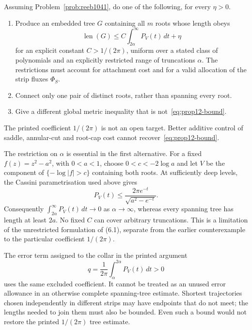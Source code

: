 \begin{problem}\label{prob:metric1041}
Assuming Problem~\ref{prob:reeb1041}, do one of the following, for every
$\eta>0$.
\begin{enumerate}
\item Produce an embedded tree $G$ containing all $m$ roots whose length obeys
  \begin{equation*}
 \operatorname{len}(G)
 \le C\int_{2\alpha}^{\infty}P_V(t)\,dt+\eta
\tag{6.1}\label{eq:metric-fanin1041}
 \end{equation*}
for an explicit constant $C>1/(2\pi)$, uniform over a stated class of
polynomials and an explicitly restricted range of truncations $\alpha$.
The restrictions must account for attachment cost and for a valid allocation
of the strip fluxes $\Phi_S$.
\item Connect only one pair of distinct roots, rather than spanning every root.
\item Give a different global metric inequality that is not~\eqref{eq:prop12-bound}.
\end{enumerate}
The printed coefficient $1/(2\pi)$ is not an open target.  Better additive
control of saddle, annular-cut and root-cap cost cannot recover~\eqref{eq:prop12-bound}.
\end{problem}

The restriction on $\alpha$ is essential in the first alternative.
For a fixed $f(z)=z^2-a^2$, with $0<a<1$, choose
$0<c<-2\log a$ and let $V$ be the component of $\{-\log|f|>c\}$
containing both roots. At sufficiently deep levels, the Cassini
parametrisation used above gives
\[
 P_V(t)\le\frac{2\pi e^{-t}}{\sqrt{a^2-e^{-t}}}.
\]
Consequently $\int_{2\alpha}^\infty P_V(t)\,dt\to0$ as
$\alpha\to\infty$, whereas every spanning tree has length at least
$2a$. No fixed $C$ can cover arbitrary truncations. This is a
limitation of the unrestricted formulation of (6.1), separate from the
earlier counterexample to the particular coefficient $1/(2\pi)$.

The error term assigned to the collar in the printed argument
\[
 q=\frac1{2\pi}\int_{\alpha}^{2\alpha}P_V(t)\,dt>0
\]
uses the same excluded coefficient. It cannot be treated as an unused
error allowance in an otherwise complete spanning-tree estimate.
Shortest trajectories chosen independently in different strips may
have endpoints that do not meet; the lengths needed to join them must
also be bounded. Even such a bound would not restore the printed
$1/(2\pi)$ tree estimate.

